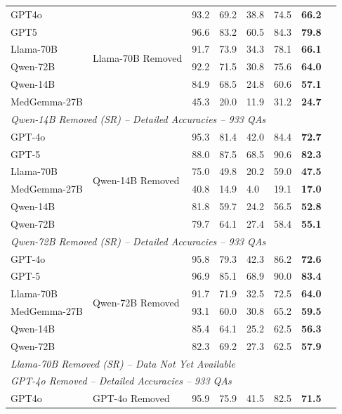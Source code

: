 \documentclass[11pt]{article}
\begin{document}
\begin{longtable}{llllllll}
\midrule
GPT4o & \multirow{6}{*}{Llama-70B Removed} & 93.2 & 69.2 & 38.8 & 74.5 & \textbf{66.2} \\
GPT5 &  & 96.6 & 83.2 & 60.5 & 84.3 & \textbf{79.8} \\
Llama-70B &  & 91.7 & 73.9 & 34.3 & 78.1 & \textbf{66.1} \\
Qwen-72B &  & 92.2 & 71.5 & 30.8 & 75.6 & \textbf{64.0} \\
Qwen-14B &  & 84.9 & 68.5 & 24.8 & 60.6 & \textbf{57.1} \\
MedGemma-27B &  & 45.3 & 20.0 & 11.9 & 31.2 & \textbf{24.7} \\
\midrule
\multicolumn{7}{l}{\textit{Qwen-14B Removed (SR) -- Detailed Accuracies -- 933 QAs}} \\
\midrule
GPT-4o & \multirow{6}{*}{Qwen-14B Removed} &  95.3 &  81.4 &  42.0 &  84.4 & \textbf{ 72.7} \\
GPT-5 &  &  88.0 &  87.5 &  68.5 &  90.6 & \textbf{ 82.3} \\
Llama-70B &  &  75.0 &  49.8 &  20.2 &  59.0 & \textbf{ 47.5} \\
MedGemma-27B &  &  40.8 &  14.9 &   4.0 &  19.1 & \textbf{ 17.0} \\
Qwen-14B &  &  81.8 &  59.7 &  24.2 &  56.5 & \textbf{ 52.8} \\
Qwen-72B &  &  79.7 &  64.1 &  27.4 &  58.4 & \textbf{ 55.1} \\
\midrule
\multicolumn{7}{l}{\textit{Qwen-72B Removed (SR) -- Detailed Accuracies -- 933 QAs}} \\
\midrule
GPT-4o & \multirow{6}{*}{Qwen-72B Removed} &  95.8 &  79.3 &  42.3 &  86.2 & \textbf{ 72.6} \\
GPT-5 &  &  96.9 &  85.1 &  68.9 &  90.0 & \textbf{ 83.4} \\
Llama-70B &  &  91.7 &  71.9 &  32.5 &  72.5 & \textbf{ 64.0} \\
MedGemma-27B &  &  93.1 &  60.0 &  30.8 &  65.2 & \textbf{ 59.5} \\
Qwen-14B &  &  85.4 &  64.1 &  25.2 &  62.5 & \textbf{ 56.3} \\
Qwen-72B &  &  82.3 &  69.2 &  27.3 &  62.5 & \textbf{ 57.9} \\
\midrule
\multicolumn{7}{l}{\textit{Llama-70B Removed (SR) -- Data Not Yet Available}} \\
\midrule
\multicolumn{7}{l}{\textit{GPT-4o Removed -- Detailed Accuracies -- 933 QAs}} \\
\midrule
GPT4o & \multirow{6}{*}{GPT-4o Removed} & 95.9 & 75.9 & 41.5 & 82.5 & \textbf{71.5} \\

\end{longtable}
\end{document}

